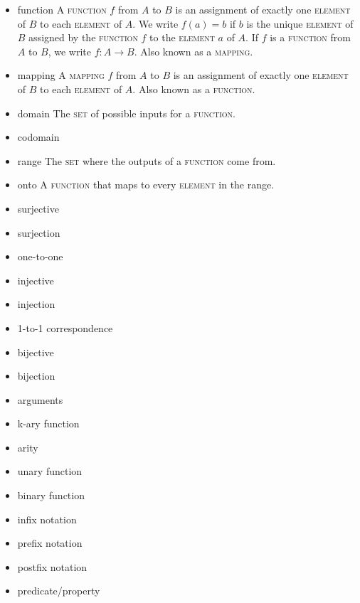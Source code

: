 \documentclass{article}
\newcommand{\term}[1]{\textsc{#1}}
\begin{document}
\begin{itemize}
\item function
  \subitem A \term{function} $f$ from $A$ to $B$ is an assignment of exactly one \term{element} of $B$ to each \term{element} of $A$. We write $f(a) = b$ if $b$ is the unique \term{element} of $B$ assigned by the \term{function} $f$ to the \term{element} $a$ of $A$. If $f$ is a \term{function} from $A$ to $B$, we write $f \colon A \to B$. Also known as a \term{mapping}.

\item mapping
  \subitem A \term{mapping} $f$ from $A$ to $B$ is an assignment of exactly one \term{element} of $B$ to each \term{element} of $A$. Also known as a \term{function}.

\item domain
  \subitem The \term{set} of possible inputs for a \term{function}.

\item codomain

\item range
  \subitem The \term{set} where the outputs of a \term{function} come from.

\item onto
  \subitem A \term{function} that maps to every \term{element} in the range.

\item surjective

\item surjection

\item one-to-one

\item injective

\item injection

\end{itemize}

\bigskip \indent
\begin{itemize}
\item 1-to-1 correspondence

\item bijective

\item bijection

\item arguments

\item k-ary function

\item arity

\item unary function

\item binary function

\item infix notation

\item prefix notation

\item postfix notation

\item predicate/property

\end{itemize}
\end{document}
